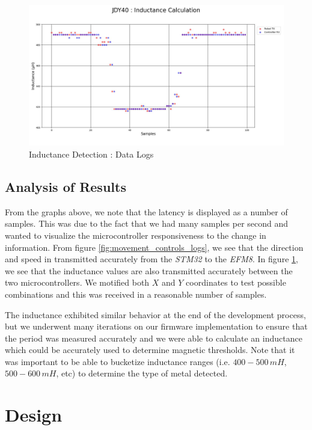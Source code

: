 \documentclass{article}
\begin{document}
\begin{figure}[htbp]
    \centering
    \includegraphics[width=1\textwidth]{Figures/Inductance_Logs.jpg}
    \caption{Inductance Detection : Data Logs}
    \label{fig:inductance_detection_logs}
\end{figure}

\subsection{Analysis of Results}

From the graphs above, we note that the latency is displayed as a number of samples. This was due to the fact that we had
many samples per second and wanted to visualize the microcontroller responsiveness to the change in information. From figure \ref{fig:movement_controls_logs}, we
see that the direction and speed in transmitted accurately from the \textit{STM32} to the \textit{EFM8}. In figure \ref{fig:inductance_detection_logs}, we see that the inductance values
are also transmitted accurately between the two microcontrollers. We motified both $X$ and $Y$ coordinates to test possible combinations and this was received in a reasonable number of samples.

The inductance exhibited similar behavior at the end of the development process, but we underwent many iterations on our firmware implementation to ensure that the period was
measured accurately and we were able to calculate an inductance which could be accurately used to determine magnetic thresholds. Note that it was important to be able to
bucketize inductance ranges (i.e. $400-500\, mH$, $500-600\, mH$, etc) to determine the type of metal detected.

\section{Design}
\end{document}
